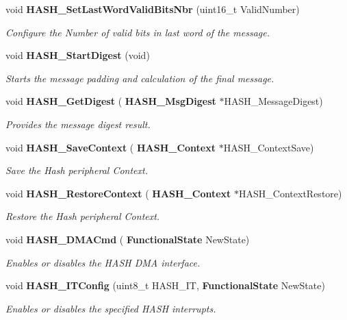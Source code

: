 \begin{DoxyCompactItemize}
void \textbf{ H\+A\+S\+H\+\_\+\+Set\+Last\+Word\+Valid\+Bits\+Nbr} (uint16\+\_\+t Valid\+Number)
\begin{DoxyCompactList}\small\item\em Configure the Number of valid bits in last word of the message. \end{DoxyCompactList}\item 
void \textbf{ H\+A\+S\+H\+\_\+\+Start\+Digest} (void)
\begin{DoxyCompactList}\small\item\em Starts the message padding and calculation of the final message. \end{DoxyCompactList}\item 
void \textbf{ H\+A\+S\+H\+\_\+\+Get\+Digest} (\textbf{ H\+A\+S\+H\+\_\+\+Msg\+Digest} $\ast$H\+A\+S\+H\+\_\+\+Message\+Digest)
\begin{DoxyCompactList}\small\item\em Provides the message digest result. \end{DoxyCompactList}\item 
void \textbf{ H\+A\+S\+H\+\_\+\+Save\+Context} (\textbf{ H\+A\+S\+H\+\_\+\+Context} $\ast$H\+A\+S\+H\+\_\+\+Context\+Save)
\begin{DoxyCompactList}\small\item\em Save the Hash peripheral Context. \end{DoxyCompactList}\item 
void \textbf{ H\+A\+S\+H\+\_\+\+Restore\+Context} (\textbf{ H\+A\+S\+H\+\_\+\+Context} $\ast$H\+A\+S\+H\+\_\+\+Context\+Restore)
\begin{DoxyCompactList}\small\item\em Restore the Hash peripheral Context. \end{DoxyCompactList}\item 
void \textbf{ H\+A\+S\+H\+\_\+\+D\+M\+A\+Cmd} (\textbf{ Functional\+State} New\+State)
\begin{DoxyCompactList}\small\item\em Enables or disables the H\+A\+SH D\+MA interface. \end{DoxyCompactList}\item 
void \textbf{ H\+A\+S\+H\+\_\+\+I\+T\+Config} (uint8\+\_\+t H\+A\+S\+H\+\_\+\+IT, \textbf{ Functional\+State} New\+State)
\begin{DoxyCompactList}\small\item\em Enables or disables the specified H\+A\+SH interrupts. \end{DoxyCompactList}\item 

\end{DoxyCompactItemize}
